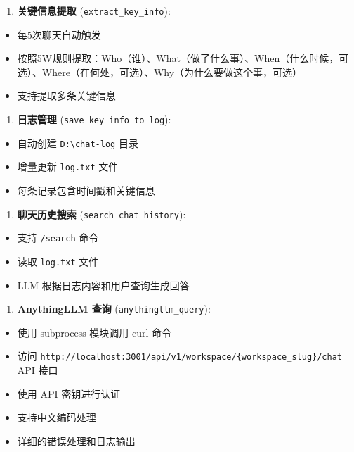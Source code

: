 \documentclass[]{article}
\providecommand{\tightlist}{%
  \setlength{\itemsep}{0pt}\setlength{\parskip}{0pt}}
\begin{document}
\begin{enumerate}
\def\labelenumi{\arabic{enumi}.}
\setcounter{enumi}{2}
\tightlist
\item
  \textbf{关键信息提取} (\texttt{extract\_key\_info}):
\end{enumerate}

\begin{itemize}
\tightlist
\item
  每5次聊天自动触发
\item
  按照5W规则提取：Who（谁）、What（做了什么事）、When（什么时候，可选）、Where（在何处，可选）、Why（为什么要做这个事，可选）
\item
  支持提取多条关键信息
\end{itemize}

\begin{enumerate}
\def\labelenumi{\arabic{enumi}.}
\setcounter{enumi}{3}
\tightlist
\item
  \textbf{日志管理} (\texttt{save\_key\_info\_to\_log}):
\end{enumerate}

\begin{itemize}
\tightlist
\item
  自动创建 \texttt{D:\textbackslash{}chat-log} 目录
\item
  增量更新 \texttt{log.txt} 文件
\item
  每条记录包含时间戳和关键信息
\end{itemize}

\begin{enumerate}
\def\labelenumi{\arabic{enumi}.}
\setcounter{enumi}{4}
\tightlist
\item
  \textbf{聊天历史搜索} (\texttt{search\_chat\_history}):
\end{enumerate}

\begin{itemize}
\tightlist
\item
  支持 \texttt{/search} 命令
\item
  读取 \texttt{log.txt} 文件
\item
  LLM 根据日志内容和用户查询生成回答
\end{itemize}

\begin{enumerate}
\def\labelenumi{\arabic{enumi}.}
\setcounter{enumi}{5}
\tightlist
\item
  \textbf{AnythingLLM 查询} (\texttt{anythingllm\_query}):
\end{enumerate}

\begin{itemize}
\tightlist
\item
  使用 subprocess 模块调用 curl 命令
\item
  访问
  \texttt{http://localhost:3001/api/v1/workspace/\{workspace\_slug\}/chat}
  API 接口
\item
  使用 API 密钥进行认证
\item
  支持中文编码处理
\item
  详细的错误处理和日志输出
\end{itemize}
\end{document}
